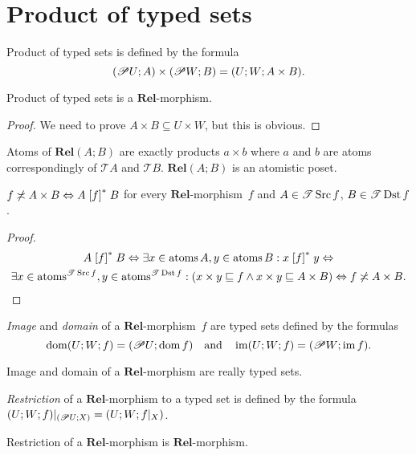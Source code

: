 \section{Product of typed sets}
\begin{defn}
Product of typed sets is defined by the formula
\[
(\mathscr{P} U;A)\times(\mathscr{P} W;B)=(U;W;A\times B).
\]
\end{defn}
\begin{prop}
Product of typed sets is a $\mathbf{Rel}$-morphism.\end{prop}
\begin{proof}
We need to prove $A\times B\subseteq U\times W$, but this is obvious.\end{proof}
\begin{obvious}
Atoms of $\mathbf{Rel}(A;B)$ are exactly products $a\times b$ where
$a$ and $b$ are atoms correspondingly of $\mathscr{T}A$ and $\mathscr{T}B$.
$\mathbf{Rel}(A;B)$ is an atomistic poset.\end{obvious}
\begin{prop}
$f\not\asymp A\times B\Leftrightarrow A\mathrel{\left[f\right]^{\ast}}B$ for every $\mathbf{Rel}$-morphism~$f$
and $A\in\mathscr{T}\operatorname{Src} f$, $B\in\mathscr{T}\operatorname{Dst} f$.\end{prop}
\begin{proof}
~
\begin{multline*}
A\mathrel{\left[f\right]^{\ast}}B\Leftrightarrow\exists x\in\operatorname{atoms} A,y\in\operatorname{atoms} B:x\mathrel{\left[f\right]^{\ast}}y\Leftrightarrow\\
\exists x\in\operatorname{atoms}^{\mathscr{T}\operatorname{Src} f},y\in\operatorname{atoms}^{\mathscr{T}\operatorname{Dst} f}:(x\times y\sqsubseteq f\land x\times y\sqsubseteq A\times B)\Leftrightarrow f\not\asymp A\times B.
\end{multline*}
\end{proof}
\begin{defn}
\emph{Image} and \emph{domain} of a $\mathbf{Rel}$-morphism~$f$
are typed sets defined by the formulas 
\[
\operatorname{dom}(U;W;f)=(\mathscr{P} U;\operatorname{dom} f)\quad\text{and}\quad\operatorname{im}(U;W;f)=(\mathscr{P} W;\operatorname{im} f).
\]
\end{defn}
\begin{obvious}
Image and domain of a $\mathbf{Rel}$-morphism are really typed sets.\end{obvious}
\begin{defn}
\emph{Restriction} of a $\mathbf{Rel}$-morphism to a typed set is
defined by the formula $(U;W;f)|_{(\mathscr{P} U;X)}=(U;W;f|_{X})$.\end{defn}
\begin{obvious}
Restriction of a $\mathbf{Rel}$-morphism is $\mathbf{Rel}$-morphism.
\end{obvious}

